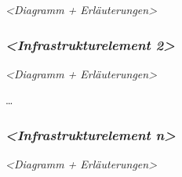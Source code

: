 \emph{\textless Diagramm + Erläuterungen\textgreater{}}

\hypertarget{infrastrukturelement-2}{%
\subsubsection{\texorpdfstring{\emph{\textless Infrastrukturelement
2\textgreater{}}}{\textless Infrastrukturelement 2\textgreater{}}}\label{infrastrukturelement-2}}

\emph{\textless Diagramm + Erläuterungen\textgreater{}}

\ldots{}

\hypertarget{infrastrukturelement-n}{%
\subsubsection{\texorpdfstring{\emph{\textless Infrastrukturelement
n\textgreater{}}}{\textless Infrastrukturelement n\textgreater{}}}\label{infrastrukturelement-n}}

\emph{\textless Diagramm + Erläuterungen\textgreater{}}
